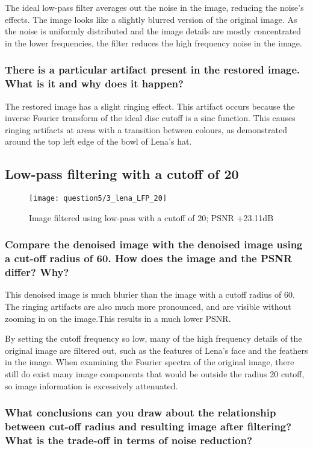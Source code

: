 The ideal low-pass filter averages out the noise in the image, reducing the noise's effects. The image looks like a slightly blurred version of the original image. As the noise is uniformly distributed and the image details are mostly concentrated in the lower frequencies, the filter reduces the high frequency noise in the image.

\subsubsection{There is a particular artifact present in the restored image. What is it and why does it happen?}

The restored image has a slight ringing effect. This artifact occurs because the inverse Fourier transform of the ideal disc cutoff is a sinc function. This causes ringing artifacts at areas with a transition between colours, as demonstrated around the top left edge of the bowl of Lena's hat.

\subsection{Low-pass filtering with a cutoff of 20}
\begin{figure}[ht]
\centering
	\texttt{[image: question5/3\_lena\_LFP\_20]}
	\caption{Image filtered using low-pass with a cutoff of 20; PSNR +23.11dB}
\end{figure}

\subsubsection{Compare the denoised image with the denoised image using a cut-off radius of 60. How does the
image and the PSNR differ? Why?}

This denoised image is much blurier than the image with a cutoff radius of 60. The ringing artifacts are also much more pronounced, and are visible without zooming in on the image.This results in a much lower PSNR. 

By setting the cutoff frequency so low, many of the high frequency details of the original image are filtered out, such as the features of Lena's face and the feathers in the image. When examining the Fourier spectra of the original image, there still do exist many image components that would be outside the radius 20 cutoff, so image information is excessively attenuated.

\subsubsection{What conclusions can you draw about the relationship between cut-off radius and resulting image after filtering? What is the trade-off in terms of noise reduction?}

